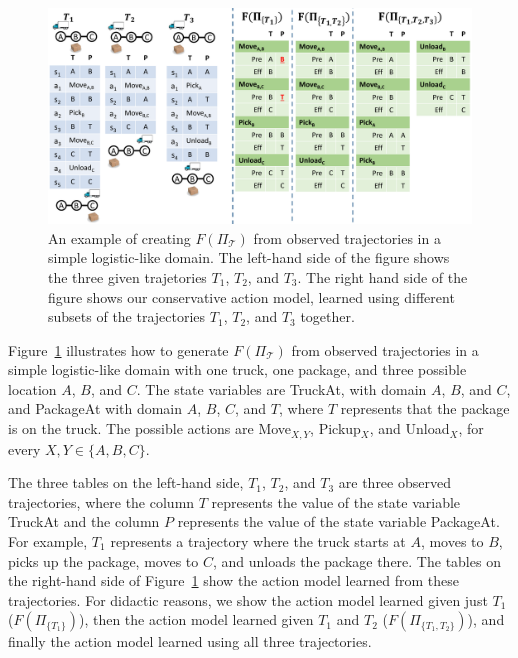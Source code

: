 \documentclass{article}
\begin{document}
	
	\begin{figure}
		\includegraphics[width=\textwidth]{example_cropped.pdf}
	\caption{An example of creating $F(\Pi_{\mathcal{T}})$ from observed trajectories in a simple logistic-like domain. The left-hand side of the figure shows the three given trajetories $T_1$, $T_2$, and $T_3$. The right hand side of the figure shows our conservative action model, 
		learned using different subsets of the trajectories $T_1$, $T_2$, and $T_3$ together.}
	\label{fig:example}
	\end{figure}
	
	
	
	Figure~\ref{fig:example} illustrates how to generate  $F(\Pi_{\mathcal{T}})$ from observed trajectories in a simple logistic-like domain with one truck, one package, and three possible location $A$, $B$, and $C$. The state variables are TruckAt, with domain $A$, $B$, and $C$, and PackageAt with domain $A$, $B$, $C$, and $T$, where $T$ represents that the package is on the truck. The possible actions are Move$_{X,Y}$, 
	Pickup$_X$, and Unload$_X$, for every $X,Y\in \{A,B,C\}$. 
	
	
	
	The three tables on the left-hand side, $T_1$, $T_2$, and $T_3$ are three observed trajectories, where the column $T$ represents the value of the state variable TruckAt and the column $P$ represents the value of the state variable PackageAt. For example, $T_1$ represents a trajectory where the truck starts at $A$, moves to $B$, picks up the package, moves to $C$, and unloads the package there. 	The tables on the right-hand side of Figure~\ref{fig:example} show the action model learned from these trajectories. For didactic reasons, we show the action model learned given just $T_1$ ($F(\Pi_{\{T_1\}})$), 
	then the action model learned given $T_1$ and $T_2$ ($F(\Pi_{\{T_1, T_2\}})$), and finally 
	the action model learned using all three trajectories. 
	
\end{document}
